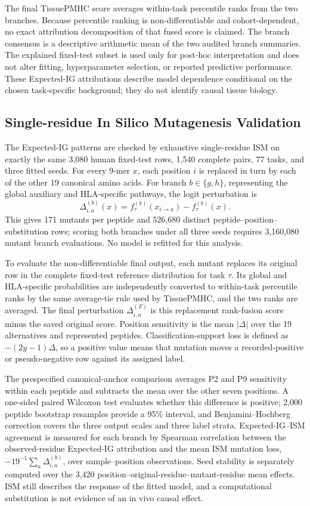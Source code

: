 The final TissuePMHC score averages within-task percentile ranks from the two branches. Because percentile ranking is non-differentiable and cohort-dependent, no exact attribution decomposition of that fused score is claimed. The branch consensus is a descriptive arithmetic mean of the two audited branch summaries. The explained fixed-test subset is used only for post-hoc interpretation and does not alter fitting, hyperparameter selection, or reported predictive performance. These Expected-IG attributions describe model dependence conditional on the chosen task-specific background; they do not identify causal tissue biology.

\subsection{Single-residue In Silico Mutagenesis Validation}

The Expected-IG patterns are checked by exhaustive single-residue ISM on exactly the same 3,080 human fixed-test rows, 1,540 complete pairs, 77 tasks, and three fitted seeds. For every 9-mer \(x\), each position \(i\) is replaced in turn by each of the other 19 canonical amino acids. For branch \(b\in\{g,h\}\), representing the global auxiliary and HLA-specific pathways, the logit perturbation is
\[
\Delta^{(b)}_{i,a}(x)=f^{(b)}_{\tau}(x_{i\rightarrow a})-f^{(b)}_{\tau}(x).
\]
This gives 171 mutants per peptide and 526,680 distinct peptide--position--substitution rows; scoring both branches under all three seeds requires 3,160,080 mutant branch evaluations. No model is refitted for this analysis.

To evaluate the non-differentiable final output, each mutant replaces its original row in the complete fixed-test reference distribution for task \(\tau\). Its global and HLA-specific probabilities are independently converted to within-task percentile ranks by the same average-tie rule used by TissuePMHC, and the two ranks are averaged. The final perturbation \(\Delta^{(F)}_{i,a}\) is this replacement rank-fusion score minus the saved original score. Position sensitivity is the mean \(\lvert\Delta\rvert\) over the 19 alternatives and represented peptides. Classification-support loss is defined as \(-(2y-1)\Delta\), so a positive value means that mutation moves a recorded-positive or pseudo-negative row against its assigned label.

The prespecified canonical-anchor comparison averages P2 and P9 sensitivity within each peptide and subtracts the mean over the other seven positions. A one-sided paired Wilcoxon test evaluates whether this difference is positive; 2,000 peptide bootstrap resamples provide a 95\% interval, and Benjamini--Hochberg correction covers the three output scales and three label strata. Expected-IG--ISM agreement is measured for each branch by Spearman correlation between the observed-residue Expected-IG attribution and the mean ISM mutation loss, \(-19^{-1}\sum_a\Delta^{(b)}_{i,a}\), over sample--position observations. Seed stability is separately computed over the 3,420 position--original-residue--mutant-residue mean effects. ISM still describes the response of the fitted model, and a computational substitution is not evidence of an in vivo causal effect.


